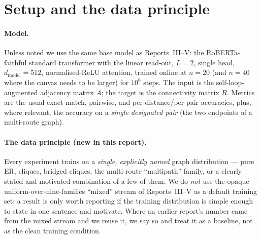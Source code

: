 \documentclass[11pt,a4paper]{article}
\begin{document}
\section{Setup and the data principle}
\label{sec:setup}

\paragraph{Model.} Unless noted we use the same base model as Reports~III--V: the RoBERTa-faithful
standard transformer with the linear read-out, $L=2$, single head, $d_{\mathrm{model}}=512$,
normalised-ReLU attention, trained online at $n=20$ (and $n=40$ where the canvas needs to be
larger) for $10^6$ steps. The input is the self-loop-augmented adjacency matrix $A$; the target is
the connectivity matrix $R$. Metrics are the usual exact-match, pairwise, and per-distance/per-pair
accuracies, plus, where relevant, the accuracy on a \emph{single designated pair} (the two
endpoints of a multi-route graph).

\paragraph{The data principle (new in this report).} Every experiment trains on a \emph{single,
explicitly named} graph distribution --- pure ER, cliques, bridged cliques, the multi-route
``multipath'' family, or a clearly stated and motivated combination of a few of them. We do
\emph{not} use the opaque uniform-over-nine-families ``mixed'' stream of Reports~III--V as a default
training set: a result is only worth reporting if the training distribution is simple enough to
state in one sentence and motivate. Where an earlier report's number came from the mixed stream and
we reuse it, we say so and treat it as a baseline, not as the clean training condition.
\end{document}
